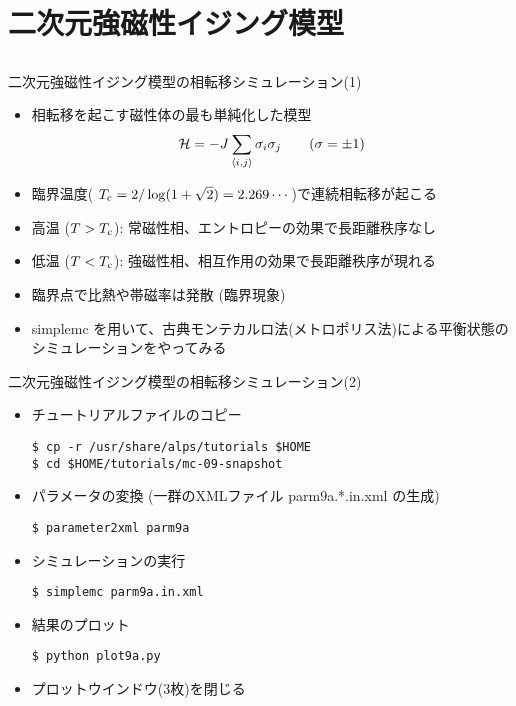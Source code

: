 \section{二次元強磁性イジング模型}
\subsection*{\redb\whiteb\greenm}

\begin{frame}[t,fragile]{二次元強磁性イジング模型の相転移シミュレーション(1)}
  \begin{itemize}
  \item 相転移を起こす磁性体の最も単純化した模型
    \[
      {\cal H} = - J \sum_{\langle i,j \rangle} \sigma_i \sigma_j \qquad (\sigma = \pm 1)
      \]
    \item 臨界温度( $T_{\rm c} = 2/\log(1+\sqrt{2}) = 2.269\cdots$)で連続相転移が起こる
    \item 高温 ($T > T_{\rm c}$): 常磁性相、エントロピーの効果で長距離秩序なし
    \item 低温 ($T < T_{\rm c}$): 強磁性相、相互作用の効果で長距離秩序が現れる
    \item 臨界点で比熱や帯磁率は発散 (臨界現象)
    \item simplemc を用いて、古典モンテカルロ法(メトロポリス法)による平衡状態のシミュレーションをやってみる
  \end{itemize}
\end{frame}

\begin{frame}[t,fragile]{二次元強磁性イジング模型の相転移シミュレーション(2)}
  \begin{itemize}
  \item チュートリアルファイルのコピー
\begin{lstlisting}
$ cp -r /usr/share/alps/tutorials $HOME
$ cd $HOME/tutorials/mc-09-snapshot
\end{lstlisting}
  \item パラメータの変換 (一群のXMLファイル parm9a.*.in.xml の生成)
\begin{lstlisting}
$ parameter2xml parm9a
\end{lstlisting}
  \item シミュレーションの実行
\begin{lstlisting}
$ simplemc parm9a.in.xml
\end{lstlisting}
\item 結果のプロット
\begin{lstlisting}
$ python plot9a.py
\end{lstlisting}
\item プロットウインドウ(3枚)を閉じる
  \end{itemize}
\end{frame}


